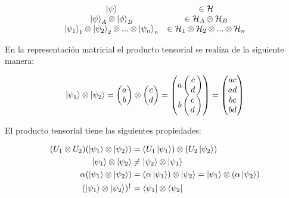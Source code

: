 \[
\begin{array}{c c}
    \ket{\psi} & \in \mathcal{H} \\
    \ket{\psi}_A \otimes \ket{\phi}_B & \in \mathcal{H}_A \otimes \mathcal{H}_B \\
    \ket{\psi_1}_1 \otimes \ket{\psi_2}_2 \otimes ... \otimes \ket{\psi_n}_n & \in \mathcal{H}_1 \otimes \mathcal{H}_2 \otimes ... \otimes \mathcal{H}_n
\end{array}
\]

En la representación matricial el producto tensorial se realiza de la siguiente manera:

\begin{equation*}
    \ket{\psi_1} \otimes \ket{\psi_2} =
    \begin{pmatrix}
        a \\
        b
    \end{pmatrix}
    \otimes
    \begin{pmatrix}
        c \\
        d
    \end{pmatrix}
    =
    \left(\!\!\!\begin{array}{c}
            a \left(\!\!\begin{array}{c}
                    c \\
                    d \\
            \end{array}\!\!\right) \\
            b \left(\!\!\begin{array}{c}
                    c \\
                    d \\
            \end{array}\!\!\right)
    \end{array}\!\!\!\right)
    =
    \begin{pmatrix}
        a c \\
        a d \\
        b c \\
        b d \\
    \end{pmatrix}
\end{equation*}

El producto tensorial tiene las siguientes propiedades:

\begin{align}
    (U_1 \otimes U_2) (\ket{\psi_1} \otimes \ket{\psi_2}) &= (U_1 \ket{\psi_1}) \otimes (U_2 \ket{\psi_2}) \\
    \ket{\psi_1} \otimes \ket{\psi_2} &\neq \ket{\psi_2} \otimes \ket{\psi_1} \\
    \alpha (\ket{\psi_1} \otimes \ket{\psi_2}) &= (\alpha \ket{\psi_1}) \otimes \ket{\psi_2} = \ket{\psi_1} \otimes (\alpha \ket{\psi_2}) \\
    (\ket{\psi_1} \otimes \ket{\psi_2})^\dagger &= \bra{\psi_1} \otimes \bra{\psi_2}
\end{align}


